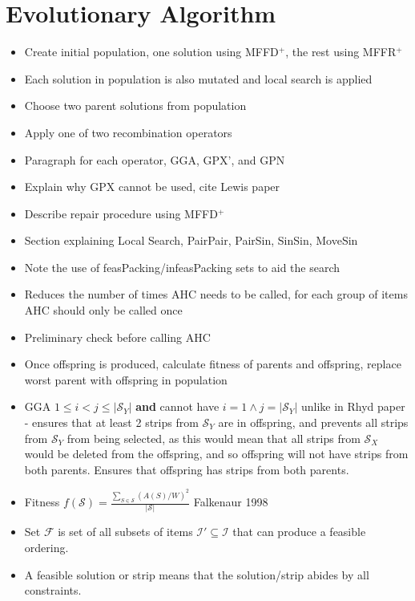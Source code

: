 \documentclass{elsarticle}
\begin{document}
\section{Evolutionary Algorithm}
\begin{itemize}
	\item Create initial population, one solution using MFFD$^+$, the rest using MFFR$^+$
	\item Each solution in population is also mutated and local search is applied
	\item Choose two parent solutions from population
	\item Apply one of two recombination operators
	\item Paragraph for each operator, GGA, GPX', and GPN
	\item Explain why GPX cannot be used, cite Lewis paper
	\item Describe repair procedure using MFFD$^+$
	\item Section explaining Local Search, PairPair, PairSin, SinSin, MoveSin
	\item Note the use of feasPacking/infeasPacking sets to aid the search
	\item Reduces the number of times AHC needs to be called, for each group of items AHC should only be called once
	\item Preliminary check before calling AHC
	\item Once offspring is produced, calculate fitness of parents and offspring, replace worst parent with offspring in population
	\item GGA $1 \leq i < j \leq |\mathcal{S}_Y|$ \textbf{and} cannot have $i = 1 \land j = |\mathcal{S}_Y|$ unlike in Rhyd paper - ensures that at least 2 strips from $\mathcal{S}_Y$ are in offspring, and prevents all strips from $\mathcal{S}_Y$ from being selected, as this would mean that all strips from $\mathcal{S}_X$ would be deleted from the offspring, and so offspring will not have strips from both parents. Ensures that offspring has strips from both parents.
	\item Fitness $f(\mathcal{S}) = \frac{\sum_{S \in \mathcal{S}} (A(S)/W)^2}{|\mathcal{S}|}$ Falkenaur 1998
	\item Set $\mathcal{F}$ is set of all subsets of items $\mathcal{I}' \subseteq \mathcal{I}$ that can produce a feasible ordering.
	\item A feasible solution or strip means that the solution/strip abides by all constraints.
\end{itemize}
\end{document}
